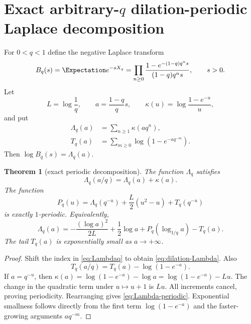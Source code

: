\documentclass[11pt,oneside]{article}
\newtheorem{theorem}{Theorem}[section]
\theoremstyle{definition}
\theoremstyle{remark}
\begin{document}
\section{Exact arbitrary-$q$ dilation-periodic Laplace decomposition}
\label{sec:periodic-laplace}

For $0<q<1$ define the negative Laplace transform
\begin{equation}\label{eq:Bq}
 B_q(s)=\Expectation e^{-sX_q}
 =\prod_{n\ge0}\frac{1-e^{-(1-q)q^ns}}{(1-q)q^ns},
 \qquad s>0.
\end{equation}
Let
\begin{equation}\label{eq:Laplace-definitions}
 L=\log\frac1q,
 \qquad
 a=\frac{1-q}{q}s,
 \qquad
 \kappa(u)=\log\frac{1-e^{-u}}{u},
\end{equation}
and put
\begin{align}
 \Lambda_q(a)&=\sum_{n\ge1}\kappa(aq^n),\label{eq:Lambdaq}\\
 T_q(a)&=\sum_{m\ge0}\log(1-e^{-aq^{-m}}).
 \label{eq:Tq}
\end{align}
Then $\log B_q(s)=\Lambda_q(a)$.

\begin{theorem}[exact periodic decomposition]\label{thm:periodic-decomposition}
The function $\Lambda_q$ satisfies
\begin{equation}\label{eq:dilation-Lambda}
 \Lambda_q(a/q)=\Lambda_q(a)+\kappa(a).
\end{equation}
The function
\begin{equation}\label{eq:Pq-def}
 P_q(u)=\Lambda_q(q^{-u})+\frac L2(u^2-u)+T_q(q^{-u})
\end{equation}
is exactly $1$-periodic.  Equivalently,
\begin{equation}\label{eq:Lambda-periodic}
 \boxed{\quad
 \Lambda_q(a)=
 -\frac{(\log a)^2}{2L}+\frac12\log a
 +P_q\!\left(\log_{1/q}a\right)-T_q(a).
 \quad}
\end{equation}
The tail $T_q(a)$ is exponentially small as $a\to+\infty$.
\end{theorem}

\begin{proof}
Shift the index in \cref{eq:Lambdaq} to obtain \cref{eq:dilation-Lambda}.  Also
\[
 T_q(a/q)=T_q(a)-\log(1-e^{-a}).
\]
If $a=q^{-u}$, then $\kappa(a)=\log(1-e^{-a})-\log a=\log(1-e^{-a})-Lu$.  The change in the quadratic term under $u\mapsto u+1$ is $Lu$.  All increments cancel, proving periodicity.  Rearranging gives \cref{eq:Lambda-periodic}.  Exponential smallness follows directly from the first term $\log(1-e^{-a})$ and the faster-growing arguments $aq^{-m}$.
\end{proof}
\end{document}
